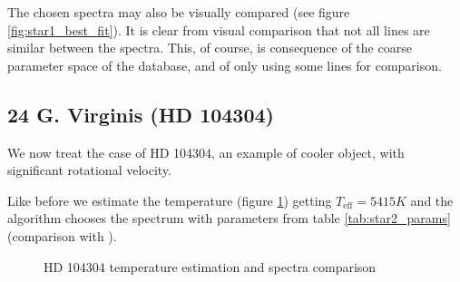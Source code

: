 \documentclass{aa}
\begin{document}
The chosen spectra may also be visually compared (see figure
\ref{fig:star1_best_fit}). It is clear from visual comparison that not all
lines are similar between the spectra. This, of course, is consequence of the
coarse parameter space of the database, and of only using some lines for comparison.


\subsection{24 G. Virginis (HD 104304)}
\label{sec:star2}

We now treat the case of HD 104304, an example of cooler object, with
significant rotational velocity.

Like before we estimate the temperature (figure \ref{fig:star2}) getting $T_\text{eff} =
5415 K$ and the algorithm chooses the spectrum with parameters from table
\ref{tab:star2_params} (comparison with \cite{aguilera-gomez_lithium_2018}).

\begin{figure}
  \caption{HD 104304 temperature estimation and spectra comparison}
  \label{fig:star2}
\end{figure}
\end{document}
